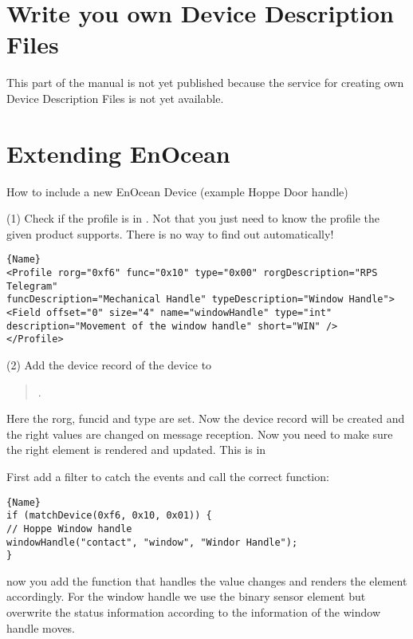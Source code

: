 
\section{Write you own Device Description Files}
\label {newddr} 

This part of the manual is not yet published because the service for creating own Device 
Description Files is not yet available.

\section{Extending EnOcean}
\label{addenocean}

How to include a new EnOcean Device (example Hoppe Door handle)

(1) Check if the profile is in . Not that 
you just need to know the profile the given product supports. There is no way 
to find out automatically! 

\begin{lstlisting}[caption=EnOcean Profile Entry]{Name}
<Profile rorg="0xf6" func="0x10" type="0x00" rorgDescription="RPS Telegram" 
funcDescription="Mechanical Handle" typeDescription="Window Handle">
<Field offset="0" size="4" name="windowHandle" type="int" 
description="Movement of the window handle" short="WIN" />
</Profile>
\end{lstlisting}

(2) Add the device record of the device to 
\begin{quote} 
. 
\end{quote} 
Here the rorg, funcid and type are set. Now the device record will be created and the 
right values are changed on message reception. Now you need to make sure the right  
element is rendered and updated. This is 
in 

First add a filter to catch the events and call the correct function:

\begin{lstlisting}[caption=Catch Device IDs]{Name}
if (matchDevice(0xf6, 0x10, 0x01)) {
// Hoppe Window handle
windowHandle("contact", "window", "Windor Handle"); 
}
\end{lstlisting}
now you add the function that handles the value changes and renders the element 
accordingly. For the window handle we use the binary sensor element but overwrite 
the status information according to the information of the window handle moves.  

